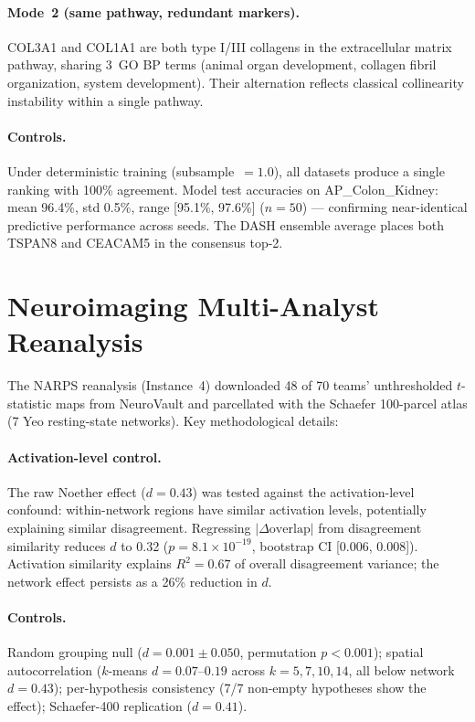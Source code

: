 \documentclass[11pt]{article}
\begin{document}
\paragraph{Mode~2 (same pathway, redundant markers).}
COL3A1 and COL1A1 are both type I/III collagens in the extracellular matrix pathway, sharing 3~GO BP terms (animal organ development, collagen fibril organization, system development).  Their alternation reflects classical collinearity instability within a single pathway.

\paragraph{Controls.}
Under deterministic training (subsample~$= 1.0$), all datasets produce a single ranking with 100\% agreement.  Model test accuracies on AP\_Colon\_Kidney: mean 96.4\%, std 0.5\%, range [95.1\%, 97.6\%] ($n = 50$) --- confirming near-identical predictive performance across seeds.  The DASH ensemble average places both TSPAN8 and CEACAM5 in the consensus top-2.

\section{Neuroimaging Multi-Analyst Reanalysis}
\label{sec:narps-si}

The NARPS reanalysis (Instance~4) downloaded 48 of 70 teams' unthresholded $t$-statistic maps from NeuroVault and parcellated with the Schaefer 100-parcel atlas (7 Yeo resting-state networks).  Key methodological details:

\paragraph{Activation-level control.}
The raw Noether effect ($d = 0.43$) was tested against the activation-level confound: within-network regions have similar activation levels, potentially explaining similar disagreement.  Regressing $|\Delta\mathrm{overlap}|$ from disagreement similarity reduces $d$ to 0.32 ($p = 8.1 \times 10^{-19}$, bootstrap CI [0.006, 0.008]).  Activation similarity explains $R^2 = 0.67$ of overall disagreement variance; the network effect persists as a 26\% reduction in $d$.

\paragraph{Controls.}
Random grouping null ($d = 0.001 \pm 0.050$, permutation $p < 0.001$); spatial autocorrelation ($k$-means $d = 0.07$--$0.19$ across $k = 5, 7, 10, 14$, all below network $d = 0.43$); per-hypothesis consistency (7/7 non-empty hypotheses show the effect); Schaefer-400 replication ($d = 0.41$).
\end{document}
